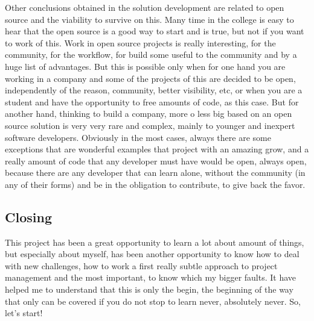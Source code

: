 Other conclusions obtained in the solution development are related to open source and the
viability to survive on this. Many time in the college is easy to hear that the
open source is a good way to start and is true, but not if you want to work of
this. Work in open source projects is really interesting, for the community,
for the workflow, for build some useful to the community and by a huge list of
advantages. But this is possible only when for one hand you are working in a
company and some of the projects of this are decided to be open, independently of the
reason, community, better visibility, etc, or when you are a student and have
the opportunity to free amounts of code, as this case. But for another hand,
thinking to build a company, more o less big based on an open source solution
is very very rare and complex, mainly to younger and inexpert software developers.
\linebreak
\linebreak
\noindent Obviously in the most cases, always there are some exceptions that are
wonderful examples that project with an amazing grow, and a really amount of
code that any developer must have would be open, always open, because there
are any developer that can learn alone, without the community (in any of their
forms) and be in the obligation to contribute, to give back the favor.

\subsection{Closing}
This project has been a great opportunity to learn a lot about amount of things,
but especially about myself, has been another opportunity to know how to deal with
new challenges, how to work a first really subtle approach to project management and
the most important, to know which my bigger faults.
It have helped me to understand that this is only the begin, the beginning of
the way that only can be covered if you do not stop to learn never, absolutely never.
\linebreak
\linebreak
\noindent So, let's start!
